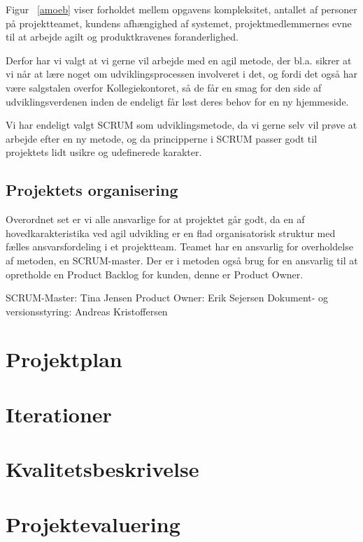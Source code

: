 \documentclass[12pt, a4paper]{report}
\begin{document}
Figur ~\ref{amoeb} viser forholdet mellem opgavens kompleksitet, antallet af personer på projektteamet, kundens afhængighed af systemet, projektmedlemmernes evne til at arbejde agilt og produktkravenes foranderlighed.

Derfor har vi valgt at vi gerne vil arbejde med en agil metode, der bl.a. sikrer at vi når at lære noget om udviklingsprocessen involveret i det, og fordi det også har være salgstalen overfor Kollegiekontoret, så de får en smag for den side af udviklingsverdenen inden de endeligt får løst deres behov for en ny hjemmeside.

Vi har endeligt valgt SCRUM som udviklingsmetode, da vi gerne selv vil prøve at arbejde efter en ny metode, og da principperne i SCRUM passer godt til projektets lidt usikre og udefinerede karakter.

\subsection{Projektets organisering}
Overordnet set er vi alle ansvarlige for at projektet går godt, da en af hovedkarakteristika ved agil udvikling er en flad organisatorisk struktur med fælles ansvarsfordeling i et projektteam. Teamet har en ansvarlig for overholdelse af metoden, en SCRUM-master. Der er i metoden også brug for en ansvarlig til at opretholde en Product Backlog for kunden, denne er Product Owner.

SCRUM-Master: Tina Jensen \newline
Product Owner: Erik Sejersen \newline
Dokument- og versionsstyring: Andreas Kristoffersen \newline

\section{Projektplan}


\section{Iterationer}


\section{Kvalitetsbeskrivelse}


\section{Projektevaluering}
\end{document}
